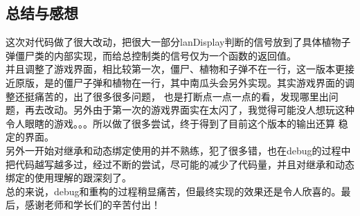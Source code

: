 \documentclass[12pt,a4paper,UTF8]{article}
\begin{document}
\subsection{总结与感想}
这次对代码做了很大改动，把很大一部分lanDisplay判断的信号放到了具体植物子弹僵尸类的内部实现，而给总控制类的信号仅为一个函数的返回值。\\
并且调整了游戏界面，相比较第一次，僵尸、植物和子弹不在一行，这一版本更接近原版，是的僵尸子弹和植物在一行，其中南瓜头会另外实现。其实游戏界面的调整还挺痛苦的，出了很多很多问题，
也是打断点一点一点的看，发现哪里出问题，再去改动。另外由于第一次的游戏界面实在太闪了，我觉得可能没人想玩这种令人眼瞎的游戏。。。所以做了很多尝试，终于得到了目前这个版本的输出还算
稳定的界面。\\
另外一开始对继承和动态绑定使用的并不熟练，犯了很多错，也在debug的过程中把代码越写越多过，经过不断的尝试，尽可能的减少了代码量，并且对继承和动态绑定的使用理解的跟深刻了。\\
总的来说，debug和重构的过程稍显痛苦，但最终实现的效果还是令人欣喜的。最后，感谢老师和学长们的辛苦付出！



%

      
  
\end{document}
